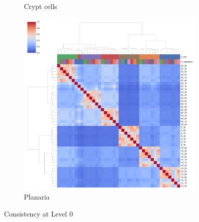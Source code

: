 \documentclass[11pt, titlepage, twoside]{article}
\begin{document}
\begin{figure}[H]
\begin{subfigure}[t]{0.3\textwidth}
        \caption{Crypt cells} \label{cm_crypt}
    \end{subfigure}
    \hfill
    \begin{subfigure}[t]{0.3\textwidth}
        \centering
        \includegraphics[width=\textwidth]{ClusterMap_L0_Panel5.pdf} 
        \caption{Planaria} \label{cm_planaria}
    \end{subfigure}
    \vspace{40pt}


\caption[]{Consistency at Level 0} \label{Figure_Clustermap_L0}
\end{figure}
\end{document}
